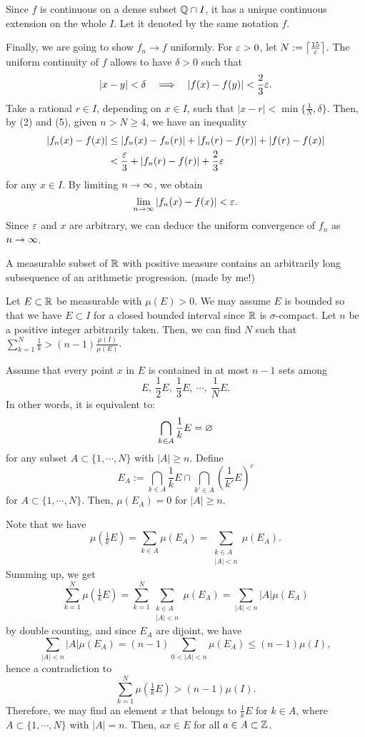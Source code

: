 \documentclass[11pt]{article}
\begin{document}
\begin{sol}
Since $f$ is continuous on a dense subset $\mathbb{Q}\cap I$, it has a unique continuous extension on the whole $I$.
Let it denoted by the same notation $f$.

\Step[4]
Finally, we are going to show $f_n\to f$ uniformly.
For $\varepsilon>0$, let $N:=\left\lceil\frac{15}{\varepsilon}\right\rceil$.
The uniform continuity of $f$ allows to have $\delta>0$ such that
\begin{align}|x-y|<\delta\impl|f(x)-f(y)|<\frac23\e.\end{align}
Take a rational $r\in I$, depending on $x\in I$, such that $|x-r|<\min\{\frac1N,\delta\}$.
Then, by (2) and (5), given $n>N\ge4$, we have an inequality
\begin{align*}
|f_n(x)-f(x)|&\le|f_n(x)-f_n(r)|+|f_n(r)-f(r)|+|f(r)-f(x)|\\
&<\frac{\varepsilon}3+|f_n(r)-f(r)|+\frac23\varepsilon
\end{align*}
for any $x\in I$.
By limiting $n\to\oo$, we obtain
\[\lim_{n\to\oo}|f_n(x)-f(x)|<\e.\]
Since $\varepsilon$ and $x$ are arbitrary, we can deduce the uniform convergence of $f_n$ as $n\to\oo$.
\end{sol}


\clearpage
\begin{prb}
A measurable subset of $\mathbb{R}$ with positive measure contains an arbitrarily long subsequence of an arithmetic progression. (made by me!)
\end{prb}
\begin{sol}
Let $E\subset\mathbb{R}$ be measurable with $\mu(E)>0$. We may assume $E$ is bounded so that we have $E\subset I$ for a closed bounded interval since $\mathbb{R}$ is $\sigma$-compact.
Let $n$ be a positive integer arbitrarily taken. Then, we can find $N$ such that $\sum_{k=1}^N\frac1k>(n-1)\frac{\mu(I)}{\mu(E)}$.

Assume that every point $x$ in $E$ is contained in at most $n-1$ sets among
\[E,\ \frac12E,\ \frac13E,\ \cdots,\ \frac1NE.\]
In other words, it is equivalent to:
\[\bigcap_{k\in A}\frac1kE=\varnothing\]
for any subset $A\subset\{1,\cdots,N\}$ with $|A|\ge n$.
Define
\[E_A:=\bigcap_{k\in A}\frac1kE\cap\bigcap_{k'\in A}\left(\frac1{k'}E\right)^c\]
for $A\subset\{1,\cdots,N\}$.
Then, $\mu(E_A)=0$ for $|A|\ge n$.

Note that we have
\[\mu(\tfrac1kE)=\sum_{k\in A}\mu(E_A)=\sum_{\substack{k\in A\\|A|<n}}\mu(E_A).\]
Summing up, we get
\[\sum_{k=1}^N\mu(\tfrac1kE)=\sum_{k=1}^N\sum_{\substack{k\in A\\|A|<n}}\mu(E_A)=\sum_{|A|<n}|A|\mu(E_A)\]
by double counting,
and since $E_A$ are dijoint, we have
\[\sum_{|A|<n}|A|\mu(E_A)=(n-1)\sum_{0<|A|<n}\mu(E_A)\le(n-1)\mu(I),\]
hence a contradiction to
\[\sum_{k=1}^N\mu(\tfrac1kE)>(n-1)\mu(I).\]
Therefore, we may find an element $x$ that belongs to $\frac1kE$ for $k\in A$, where $A\subset\{1,\cdots,N\}$ with $|A|=n$.
Then, $ax\in E$ for all $a\in A\subset\mathbb{Z}$.

\end{sol}
\end{document}
